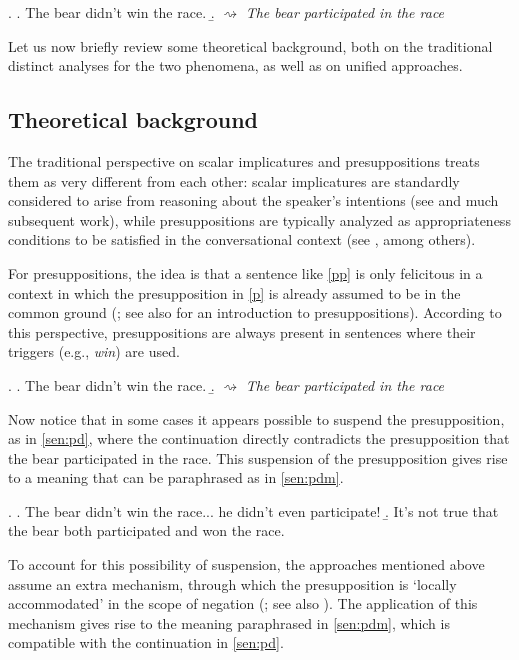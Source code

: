 \documentclass[12pt, letterpaper]{article}
\begin{document}
\ex. \label{billpres} \a. \label{sen:p1} The bear didn't win the race. 
\b. \label{inf:p1} $\rightsquigarrow$ \textit{The bear participated in the race}

Let us now briefly review some theoretical background, both on the traditional distinct analyses for the two phenomena, as well as on unified approaches.  

\subsection{Theoretical background}\label{sec:thebac}

The traditional perspective on scalar implicatures and presuppositions treats them as very different from each other: scalar implicatures are standardly considered to arise from reasoning about the speaker's intentions (see \citealt{Grice:1975} and much subsequent work), while presuppositions are typically analyzed as appropriateness conditions to be satisfied in the conversational context (see \citealt{Stalnaker:1974, Karttunen:1974, Heim:1982}, among others). 

For presuppositions, the idea is that a sentence like \ref{pp} is only felicitous in a context in which the presupposition in \ref{p} is already assumed to be in the common ground (\citealt{Stalnaker:1974, Karttunen:1974, Heim:1982, Heim:1983}; see also \citealt{Beaver:2010} for an introduction to presuppositions). According to this perspective, presuppositions are always present in sentences where their triggers (e.g., \textit{win}) are used. 

\ex. \a. \label{pp} The bear didn't win the race. 
\b. \label{p} $\rightsquigarrow$ \textit{The bear participated in the race}

Now notice that in some cases it appears possible to suspend the presupposition, as in \ref{sen:pd}, where the continuation directly contradicts the presupposition that the bear participated in the race. This suspension of the presupposition gives rise to a meaning that can be paraphrased as in \ref{sen:pdm}. 

\ex. \a. \label{sen:pd} The bear didn't win the race... he didn't even participate! 
\b. \label{sen:pdm} It's not true that the bear both participated and won the race.

To account for this possibility of suspension, the approaches mentioned above assume an extra mechanism, through which the presupposition is `locally accommodated' in the scope of negation (\citealt{Heim:1983}; see also \citealt{Fintel:2008b}). The application of this mechanism gives rise to the meaning paraphrased in \ref{sen:pdm}, which is compatible with the continuation in \ref{sen:pd}. 
\end{document}
